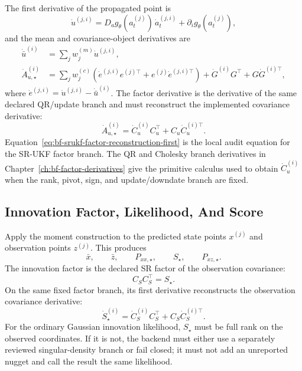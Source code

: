 The first derivative of the propagated point is
\begin{equation}
\label{eq:bf-srukf-propagated-point-first}
  \dot u^{(j,i)}
  =
  D_a g_\theta(a_t^{(j)})\,\dot a_t^{(j,i)}
  +\partial_i g_\theta(a_t^{(j)}),
\end{equation}
and the mean and covariance-object derivatives are
\begin{align}
\label{eq:bf-srukf-moment-mean-first}
  \dot{\bar u}^{(i)}
  &=
  \sum_j w_j^{(m)}\dot u^{(j,i)},\\
\label{eq:bf-srukf-moment-covariance-first}
  \dot A_{u,\star}^{(i)}
  &=
  \sum_j w_j^{(c)}
  \left(
    \dot e^{(j,i)}e^{(j)\top}
    +e^{(j)}\dot e^{(j,i)\top}
  \right)
  +\dot G^{(i)}G^\top+G\dot G^{(i)\top},
\end{align}
where \(\dot e^{(j,i)}=\dot u^{(j,i)}-\dot{\bar u}^{(i)}\).  The factor
derivative is the derivative of the same declared QR/update branch and must
reconstruct the implemented covariance derivative:
\begin{equation}
\label{eq:bf-srukf-factor-reconstruction-first}
  \dot A_{u,\star}^{(i)}
  =
  \dot C_u^{(i)}C_u^\top+C_u\dot C_u^{(i)\top}.
\end{equation}
Equation~\eqref{eq:bf-srukf-factor-reconstruction-first} is the local audit
equation for the SR-UKF factor branch.  The QR and Cholesky branch derivatives
in Chapter~\ref{ch:bf-factor-derivatives} give the primitive calculus used to
obtain \(\dot C_u^{(i)}\) when the rank, pivot, sign, and update/downdate
branch are fixed.

\subsection{Innovation Factor, Likelihood, And Score}
\label{sec:bf-srukf-innovation-score}

Apply the moment construction to the predicted state points \(x^{(j)}\) and
observation points \(z^{(j)}\).  This produces
\[
  \bar x,\qquad
  \bar z,\qquad
  P_{xx,\star},\qquad
  S_\star,\qquad
  P_{xz,\star}.
\]
The innovation factor is the declared SR factor of the observation covariance:
\begin{equation}
\label{eq:bf-srukf-innovation-factor}
  C_S C_S^\top=S_\star .
\end{equation}
On the same fixed factor branch, its first derivative reconstructs the
observation covariance derivative:
\begin{equation}
\label{eq:bf-srukf-innovation-factor-first}
  \dot S_\star^{(i)}
  =
  \dot C_S^{(i)}C_S^\top+C_S\dot C_S^{(i)\top}.
\end{equation}
For the ordinary Gaussian innovation likelihood, \(S_\star\) must be full rank
on the observed coordinates.  If it is not, the backend must either use a
separately reviewed singular-density branch or fail closed; it must not add an
unreported nugget and call the result the same likelihood.

